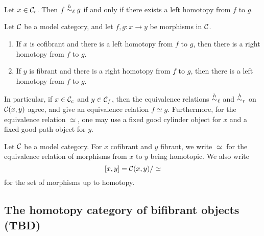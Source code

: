 \begin{proposition} %
	Let \(x\in\mathcal{C}_c\). Then \(f\overset{h}{\sim}_\ell g\) if and only if there exists a left homotopy from \(f\) to \(g\).
\end{proposition}

\begin{propositiondef} %
	Let \(\mathcal{C}\) be a model category, and let \(f,g\!:x\to y\) be morphisms in \(\mathcal{C}\).
	\begin{enumerate}[label=(\arabic*)]
		\item If \(x\) is cofibrant and there is a left homotopy from \(f\) to \(g\), then there is a right homotopy from \(f\) to \(g\).
		\item If \(y\) is fibrant and there is a right homotopy from \(f\) to \(g\), then there is a left homotopy from \(f\) to \(g\).
	\end{enumerate}
	In particular, if \(x\in\mathcal{C}_c\) and \(y\in\mathcal{C}_f\), then the equivalence relations \(\overset{h}{\sim}_\ell\) and \(\overset{h}{\sim}_r\) on \(\mathcal{C}(x,y)\)
	agree, and give an equivalence relation \(f\simeq g\). Furthermore, for the equivalence relation \(\simeq\), one may use a fixed good cylinder
	object for \(x\) and a fixed good path object for \(y\).
\end{propositiondef}

\begin{notation}
	Let \(\mathcal{C}\) be a model category. For \(x\) cofibrant and \(y\) fibrant, we write \(\simeq\) for the equivalence relation of morphisms from \(x\) to \(y\) being homotopic.
	We also write
	\[ [x,y] = \mathcal{C}(x,y)/\simeq \]
	for the set of morphisms up to homotopy.
\end{notation}

\subsection{The homotopy category of bifibrant objects (TBD)}


